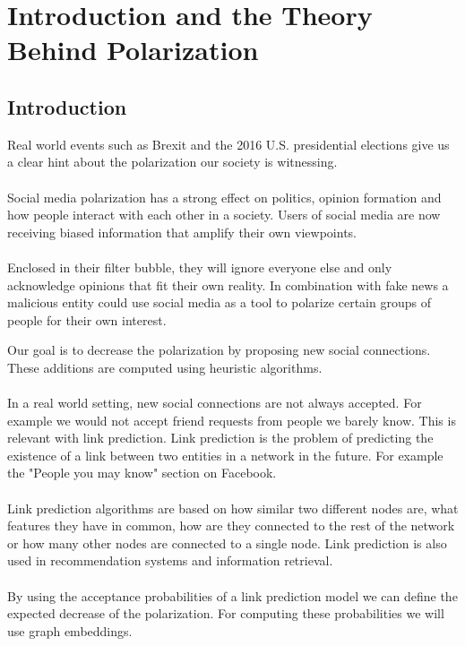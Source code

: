 \chapter{Introduction and the Theory Behind Polarization}
\label{ch:Introduction}


\section{Introduction}
\label{sec:Objectives}

Real world events such as Brexit and the 2016 U.S. presidential elections give us a clear hint about the polarization our society is witnessing. 
\\
\\
Social media polarization has a strong effect on politics, opinion formation and how people interact with each other in a society. Users of social media are now receiving biased information that amplify their own viewpoints. 
\\
\\
Enclosed in their filter bubble, they will ignore everyone else and only acknowledge opinions that fit their own reality. In combination with fake news a malicious entity could use social media as a tool to polarize certain groups of people for their own interest. 
\clearpage

\noindent Our goal is to decrease the polarization by proposing new social connections. These additions are computed using heuristic algorithms.
\\
\\
\noindent In a real world setting, new social connections are not always accepted.  For example we would not accept friend requests from people we barely know.
 This is relevant with link prediction. Link prediction is the problem of predicting the existence of a link between two entities in a network in the future. For example the "People you may know" section on Facebook.		
\\		
\\		
Link prediction algorithms are based on how similar two different nodes are, what features they have in common, how are they connected to the rest of the network or how many other nodes are connected to a single node. 		
Link prediction is also used in recommendation systems and  information retrieval.
\\
\\
By using the acceptance probabilities of a link prediction model we can define the expected decrease of the polarization. For computing these probabilities we will use graph embeddings.

